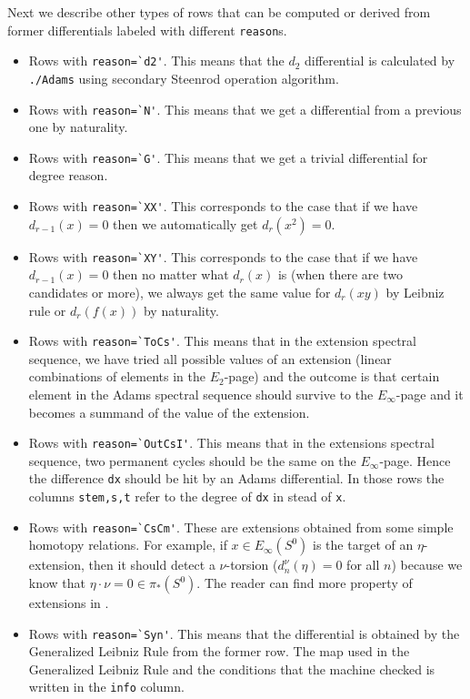 \documentclass{amsart}
\numberwithin{equation}{section}
\begin{document}
Next we describe other types of rows that can be computed or derived from former differentials labeled with different \verb|reason|s.
\begin{itemize}
    \item Rows with \verb|reason=`d2'|. This means that the $d_2$ differential is calculated by \verb|./Adams| using secondary Steenrod operation algorithm.
    \item Rows with \verb|reason=`N'|. This means that we get a differential from a previous one by naturality.
    \item Rows with \verb|reason=`G'|. This means that we get a trivial differential for degree reason.
    \item Rows with \verb|reason=`XX'|. This corresponds to the case that if we have $d_{r-1}(x)=0$ then we automatically get $d_r(x^2)=0$.
    \item Rows with \verb|reason=`XY'|. This corresponds to the case that if we have $d_{r-1}(x)=0$ then no matter what $d_r(x)$ is (when there are two candidates or more), we always get the same value for $d_r(xy)$ by Leibniz rule or $d_r(f(x))$ by naturality.
    \item Rows with \verb|reason=`ToCs'|. This means that in the extension spectral sequence, we have tried all possible values of an extension (linear combinations of elements in the $E_2$-page) and the outcome is that certain element in the Adams spectral sequence should survive to the $E_\infty$-page and it becomes a summand of the value of the extension.
    \item Rows with \verb|reason=`OutCsI'|. This means that in the extensions spectral sequence, two permanent cycles should be the same on the $E_\infty$-page. Hence the difference \verb|dx| should be hit by an Adams differential. In those rows the columns \verb|stem,s,t| refer to the degree of \verb|dx| in stead of \verb|x|.
    \item Rows with \verb|reason=`CsCm'|. These are extensions obtained from some simple homotopy relations. For example, if $x\in E_\infty(S^0)$ is the target of an $\eta$-extension, then it should detect a $\nu$-torsion ($d_n^{\nu}(\eta)=0$ for all $n$) because we know that $\eta\cdot\nu=0\in \pi_*(S^0)$. The reader can find more property of extensions in \cite{LWX126}.
    \item Rows with \verb|reason=`Syn'|. This means that the differential is obtained by the Generalized Leibniz Rule from the former row. The map used in the Generalized Leibniz Rule and the conditions that the machine checked is written in the \verb|info| column.

\end{itemize}
\end{document}
